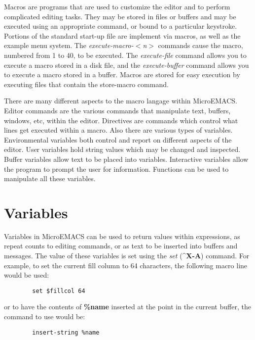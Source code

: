 Macros are programs that are used to customize the editor and to
perform complicated editing tasks.  They may be stored in files or
buffers and may be executed using an appropriate command, or bound to
a particular keystroke.  Portions of the standard start-up file are
implement via macros, as well as the example menu system.  The
{\it{}execute-macro-$<${}n$>${}} 
commands cause the macro, numbered from 1 to 40, to be executed.  The
{\it{}execute-file}  command allows you to execute
a macro stored in a disk file, and the {\it{}execute-buffer}
 command allows you to execute a macro stored in
a buffer.  Macros are stored for easy execution by executing files
that contain the store-macro command.

There are many different aspects to the macro langage within
MicroEMACS.  Editor commands are the various commands that manipulate
text, buffers, windows, etc, within the editor.  Directives are commands
which control what lines get executed within a macro.  Also there are
various types of variables.  Environmental variables both control and
report on different aspects of the editor.  User variables hold string
values which may be changed and inspected.  Buffer variables allow text
to be placed into variables.  Interactive variables allow the program to
prompt the user for information.  Functions can be used to manipulate
all these variables.

\section{Variables}

Variables in MicroEMACS can be used to return values within
expressions, as repeat counts to editing commands, or as text to be
inserted into buffers and messages.  The value of these variables is
set using the {\it{}set} ({\bf{}\^{}X-A}) command.  For example, to
set the current fill column to 64 characters, the following macro line
would be used:

\begin{verbatim}
        set $fillcol 64
\end{verbatim}

or to have the contents of {\bf{}\%name} inserted at the point in the
current buffer, the command to use would be:

\begin{verbatim}
        insert-string %name
\end{verbatim}
